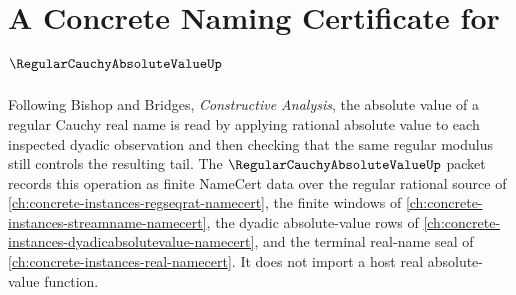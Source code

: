 \chapter{A Concrete Naming Certificate for $\RegularCauchyAbsoluteValueUp$}
\label{ch:concrete-instances-regular-cauchy-absolute-value-namecert}

Following Bishop and Bridges, \emph{Constructive Analysis}, the absolute value of a regular Cauchy real name is read by applying rational absolute value to each inspected dyadic observation and then checking that the same regular modulus still controls the resulting tail. The $\RegularCauchyAbsoluteValueUp$ packet records this operation as finite NameCert data over the regular rational source of \autoref{ch:concrete-instances-regseqrat-namecert}, the finite windows of \autoref{ch:concrete-instances-streamname-namecert}, the dyadic absolute-value rows of \autoref{ch:concrete-instances-dyadicabsolutevalue-namecert}, and the terminal real-name seal of \autoref{ch:concrete-instances-real-namecert}. It does not import a host real absolute-value function.

